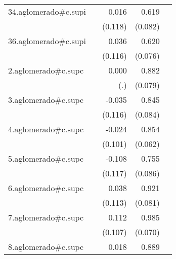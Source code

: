 {\begin{longtable}{l*{4}{D{.}{.}{-1}}}
\addlinespace
34.aglomerado#c.supi&                     &       0.016         &       0.619\sym{***}&                     \\
            &                     &     (0.118)         &     (0.082)         &                     \\
\addlinespace
36.aglomerado#c.supi&                     &       0.036         &       0.620\sym{***}&                     \\
            &                     &     (0.116)         &     (0.076)         &                     \\
\addlinespace
2.aglomerado#c.supc&                     &       0.000         &       0.882\sym{***}&                     \\
            &                     &         (.)         &     (0.079)         &                     \\
\addlinespace
3.aglomerado#c.supc&                     &      -0.035         &       0.845\sym{***}&                     \\
            &                     &     (0.116)         &     (0.084)         &                     \\
\addlinespace
4.aglomerado#c.supc&                     &      -0.024         &       0.854\sym{***}&                     \\
            &                     &     (0.101)         &     (0.062)         &                     \\
\addlinespace
5.aglomerado#c.supc&                     &      -0.108         &       0.755\sym{***}&                     \\
            &                     &     (0.117)         &     (0.086)         &                     \\
\addlinespace
6.aglomerado#c.supc&                     &       0.038         &       0.921\sym{***}&                     \\
            &                     &     (0.113)         &     (0.081)         &                     \\
\addlinespace
7.aglomerado#c.supc&                     &       0.112         &       0.985\sym{***}&                     \\
            &                     &     (0.107)         &     (0.070)         &                     \\
\addlinespace
8.aglomerado#c.supc&                     &       0.018         &       0.889\sym{***}&                     \\

\end{longtable}}
